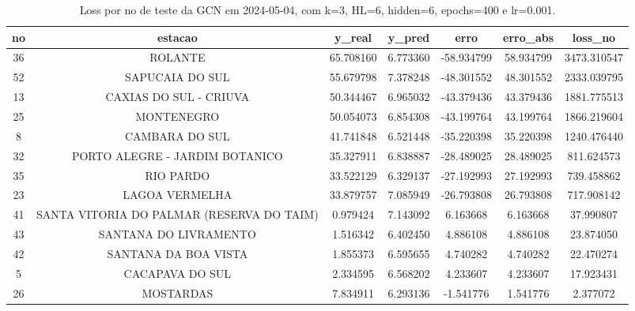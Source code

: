 \begin{table}[h]
\centering
\caption{Loss por no de teste da GCN em 2024-05-04, com k=3, HL=6, hidden=6, epochs=400 e lr=0.001.}
\label{tab:gcn_loss_k3_hl6_h6_e400_d20240504}
\begin{tabular}{ccccccc}
\toprule
no & estacao & y\_real & y\_pred & erro & erro\_abs & loss\_no \\
\midrule
36 & ROLANTE & 65.708160 & 6.773360 & -58.934799 & 58.934799 & 3473.310547 \\
52 & SAPUCAIA DO SUL & 55.679798 & 7.378248 & -48.301552 & 48.301552 & 2333.039795 \\
13 & CAXIAS DO SUL - CRIUVA & 50.344467 & 6.965032 & -43.379436 & 43.379436 & 1881.775513 \\
25 & MONTENEGRO & 50.054073 & 6.854308 & -43.199764 & 43.199764 & 1866.219604 \\
8 & CAMBARA DO SUL & 41.741848 & 6.521448 & -35.220398 & 35.220398 & 1240.476440 \\
32 & PORTO ALEGRE - JARDIM BOTANICO & 35.327911 & 6.838887 & -28.489025 & 28.489025 & 811.624573 \\
35 & RIO PARDO & 33.522129 & 6.329137 & -27.192993 & 27.192993 & 739.458862 \\
23 & LAGOA VERMELHA & 33.879757 & 7.085949 & -26.793808 & 26.793808 & 717.908142 \\
41 & SANTA VITORIA DO PALMAR (RESERVA DO TAIM) & 0.979424 & 7.143092 & 6.163668 & 6.163668 & 37.990807 \\
43 & SANTANA DO LIVRAMENTO & 1.516342 & 6.402450 & 4.886108 & 4.886108 & 23.874050 \\
42 & SANTANA DA BOA VISTA & 1.855373 & 6.595655 & 4.740282 & 4.740282 & 22.470274 \\
5 & CACAPAVA DO SUL & 2.334595 & 6.568202 & 4.233607 & 4.233607 & 17.923431 \\
26 & MOSTARDAS & 7.834911 & 6.293136 & -1.541776 & 1.541776 & 2.377072 \\
\bottomrule
\end{tabular}
\end{table}
